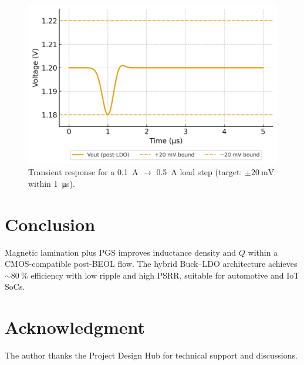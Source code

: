 \documentclass[journal]{IEEEtran}
\begin{document}
\begin{figure}[t]
  \centering
  \includegraphics[width=.95\linewidth]{fig/fig5_transient_response.png}
  \caption{Transient response for a \SI{0.1}{\ampere} $\rightarrow$ \SI{0.5}{\ampere} load step (target: $\pm\SI{20}{\milli\volt}$ within \SI{1}{\micro\second}).}
  \label{fig:transient}
\end{figure}

\section{Conclusion}
Magnetic lamination plus PGS improves inductance density and $Q$ within a CMOS-compatible post-BEOL flow. The hybrid Buck--LDO architecture achieves $\sim\SI{80}{\percent}$ efficiency with low ripple and high PSRR, suitable for automotive and IoT SoCs.

\section*{Acknowledgment}
The author thanks the Project Design Hub for technical support and discussions.
\end{document}
